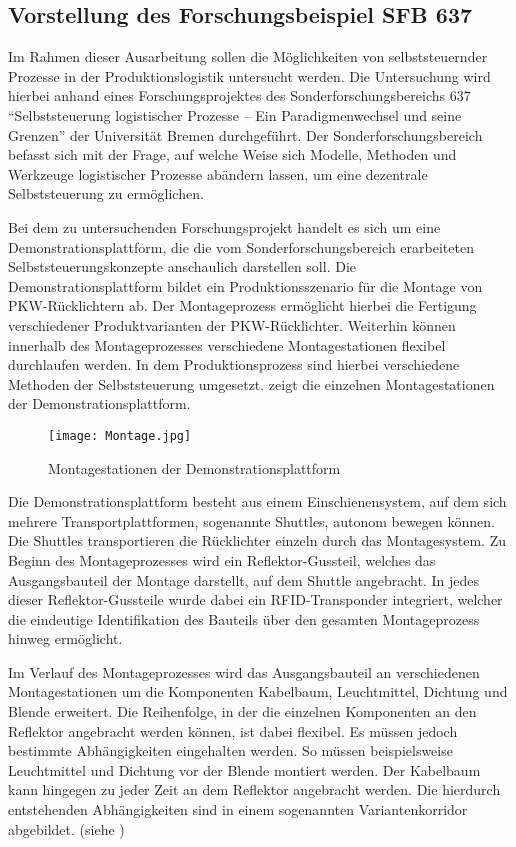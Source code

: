\subsection{Vorstellung des Forschungsbeispiel SFB 637}
\label{sec:Forschungsbeispiel_SFB}
Im Rahmen dieser Ausarbeitung sollen die Möglichkeiten von selbststeuernder
Prozesse in der Produktionslogistik untersucht werden. Die Untersuchung wird
hierbei anhand eines Forschungsprojektes des Sonderforschungsbereichs 637
"`Selbststeuerung logistischer Prozesse – Ein Paradigmenwechsel und seine
Grenzen"' der Universität Bremen durchgeführt. Der Sonderforschungsbereich
befasst sich mit der Frage, auf welche Weise sich Modelle, Methoden und
Werkzeuge logistischer Prozesse abändern lassen, um eine dezentrale 
Selbststeuerung zu ermöglichen.

Bei dem zu untersuchenden Forschungsprojekt handelt es sich um eine
Demonstrationsplattform, die die vom Sonderforschungsbereich erarbeiteten
Selbststeuerungskonzepte anschaulich darstellen soll. Die
Demonstrationsplattform bildet ein Produktionsszenario für die Montage von
PKW-Rücklichtern ab. Der Montageprozess ermöglicht hierbei die Fertigung
verschiedener Produktvarianten der PKW-Rücklichter. Weiterhin können innerhalb
des Montageprozesses verschiedene Montagestationen flexibel durchlaufen werden.
In dem Produktionsprozess sind hierbei verschiedene Methoden der
Selbststeuerung umgesetzt.  zeigt die einzelnen
Montagestationen der Demonstrationsplattform.

\begin{figure}[htb] 
\centering
\texttt{[image: Montage.jpg]}
\caption[Montagestation]{Montagestationen der Demonstrationsplattform\protect\footnotemark}
\label{fig:Montagestation}
\end{figure}

Die Demonstrationsplattform besteht aus einem Einschienensystem, auf dem sich
mehrere Transportplattformen, sogenannte Shuttles, autonom bewegen können. Die
Shuttles transportieren die Rücklichter einzeln durch das Montagesystem. Zu
Beginn des Montageprozesses wird ein Reflektor-Gussteil, welches das
Ausgangsbauteil der Montage darstellt, auf dem Shuttle angebracht. In jedes
dieser Reflektor-Gussteile wurde dabei ein RFID-Transponder integriert, welcher
die eindeutige Identifikation des Bauteils über den gesamten Montageprozess
hinweg ermöglicht.

Im Verlauf des Montageprozesses wird das Ausgangsbauteil an verschiedenen
Montagestationen um die Komponenten Kabelbaum, Leuchtmittel, Dichtung und
Blende erweitert. Die Reihenfolge, in der die einzelnen Komponenten an den
Reflektor angebracht werden können, ist dabei flexibel. Es müssen jedoch
bestimmte Abhängigkeiten eingehalten werden. So müssen beispielsweise 
Leuchtmittel und Dichtung vor der Blende montiert werden. Der Kabelbaum kann
hingegen zu jeder Zeit an dem Reflektor angebracht werden. Die hierdurch
entstehenden Abhängigkeiten sind in einem sogenannten Variantenkorridor
abgebildet. (siehe )

